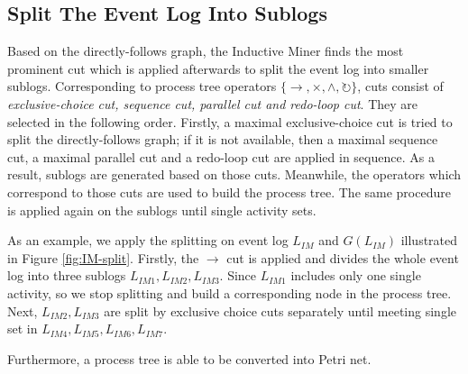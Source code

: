\subsection{Split The Event Log Into Sublogs}
Based on the directly-follows graph, the Inductive Miner finds the most prominent cut which is applied afterwards to split the event log into smaller sublogs. Corresponding to process tree operators $ \{\rightarrow, \times, \land, \circlearrowright \}$, cuts consist of \emph{exclusive-choice cut, sequence cut, parallel cut and redo-loop cut}. They are selected in the following order. Firstly, a maximal exclusive-choice cut is  tried to split the directly-follows graph; if it is not available, then a maximal sequence cut, a  maximal parallel cut and a redo-loop cut are applied in sequence. As a result, sublogs are generated based on those cuts. Meanwhile, the operators which correspond to those cuts are used to build the process tree. The same procedure is applied again on the sublogs until single activity sets.  

As an example, we apply the splitting on event log $L_{IM}$ and $G(L_{IM})$ illustrated in Figure \ref{fig:IM-split}. Firstly, the $\rightarrow$ cut is applied and divides the whole event log into three sublogs $L_{IM1},L_{IM2},L_{IM3}$. Since $L_{IM1}$ includes only one single activity, so we stop splitting and build a corresponding node in the process tree. Next, $L_{IM2},L_{IM3}$ are split by exclusive choice cuts separately until meeting single set in $L_{IM4},L_{IM5},L_{IM6},L_{IM7}$.

Furthermore, a process tree is able to be converted into Petri net. 
